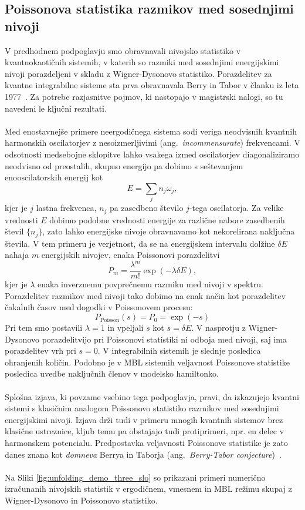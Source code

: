  \subsection{Poissonova statistika razmikov med sosednjimi nivoji}
 V predhodnem podpoglavju smo obravnavali nivojsko statistiko v kvantnokaotičnih sistemih, v katerih so razmiki med sosednjimi energijskimi nivoji porazdeljeni v skladu z Wigner-Dysonovo statistiko. Porazdelitev za kvantne integrabilne sisteme sta prva obravnavala Berry in Tabor v članku iz leta 1977~\cite{berry1977level}. Za potrebe razjasnitve pojmov, ki nastopajo v magistrski nalogi, so tu navedeni le ključni rezultati. \\\\
 Med enostavnejše primere neergodičnega sistema sodi veriga neodvisnih kvantnih harmonskih oscilatorjev z nesoizmerljivimi (ang.~\emph{incommensurate}) frekvencami. V odsotnosti medsebojne sklopitve lahko vsakega izmed oscilatorjev diagonaliziramo neodvisno od preostalih, skupno energijo pa dobimo s seštevanjem enooscilatorskih energij kot 
 $$
 E=\sum_j n_j\omega_j,
 $$ 
 kjer je $j$ lastna frekvenca, $n_j$ pa zasedbeno število $j$-tega oscilatorja. Za velike vrednosti $E$ dobimo podobne vrednosti energije za različne nabore zasedbenih števil $\{n_j\}$, zato lahko energijske nivoje obravnavamo kot nekorelirana naključna števila. V tem primeru je verjetnost, da se na energijskem intervalu dolžine $\delta E$ nahaja $m$ energijskih nivojev, enaka Poissonovi porazdelitvi 
 \begin{equation}
 P_m=\frac{\lambda^m}{m!}\exp\left(-\lambda \delta E\right),
 \end{equation}
 kjer je $\lambda$ enaka inverznemu povprečnemu razmiku med nivoji v spektru. Porazdelitev razmikov med nivoji tako dobimo na enak način kot porazdelitev čakalnih časov med dogodki v Poissonovem procesu:
 \begin{equation}\label{eq:poisson}
 P_\mathrm{Poisson}(s)=P_0=\exp\left(-s\right)
 \end{equation}
 Pri tem smo postavili $\lambda=1$ in vpeljali $s$ kot  $s=\delta E$. V nasprotju z Wigner-Dysonovo porazdelitvijo pri Poissonovi statistiki ni odboja med nivoji, saj ima porazdelitev vrh pri $s=0$. V integrabilnih sistemih je slednje posledica ohranjenih količin. Podobno je v MBL sistemih veljavnost Poissonove statistike posledica uvedbe naključnih členov v modelsko hamiltonko. \\\\
 Splošna izjava, ki povzame vsebino tega podpoglavja, pravi, da izkazujejo kvantni sistemi s klasičnim analogom Poissonovo statistiko razmikov med sosednjimi energijskimi nivoji. Izjava drži tudi v primeru mnogih kvantnih sistemov brez klasične ustreznice, kljub temu pa obstajajo tudi protiprimeri, npr. en delec v harmonskem potencialu. Predpostavka veljavnosti Poissonove statistike je zato danes znana kot \emph{domneva} Berrya in Taborja (ang.~\emph{Berry-Tabor conjecture})~\cite{berry1977level}.\\\\
 Na Sliki \ref{fig:unfolding_demo_three_slo} so prikazani primeri numerično izračunanih nivojskih statistik v ergodičnem, vmesnem in MBL režimu skupaj z Wigner-Dysonovo in Poissonovo statistiko. 
